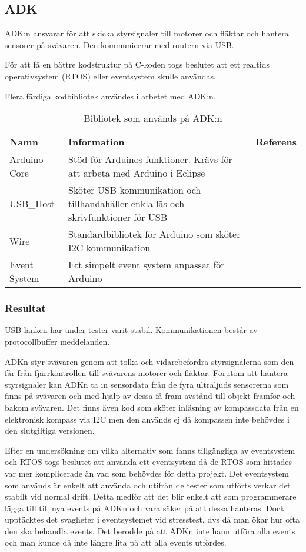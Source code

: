 \subsection{ADK}
ADK:n ansvarar för att skicka styrsignaler till motorer och fläktar och hantera sensorer på svävaren. 
Den kommunicerar med routern via USB.

För att få en bättre kodstruktur på C-koden togs beslutet att ett realtids operativsystem (RTOS) 
eller eventsystem skulle användas.

Flera färdiga kodbibliotek användes i arbetet med ADK:n. 

\begin{table}[htb]
\centering
\caption{Bibliotek som används på ADK:n}
\label{tbl:BOM}
\begin{tabular}{|l|p{}|c|}
\hline
\textbf{Namn} & \textbf{Information} & \textbf{Referens} \\
\hline
Arduino Core & Stöd för Arduinos funktioner. Krävs för att arbeta med Arduino i Eclipse &  \cite{Eclipse_ArduinoCore}\\ 
\hline
USB\_Host & Sköter USB kommunikation och tillhandahåller enkla läs och skrivfunktioner för USB & \cite{USBHost}\\
\hline
Wire & Standardbibliotek för Arduino som sköter I2C kommunikation &  \cite{Wire}\\
\hline
Event System & Ett simpelt event system anpassat för Arduino & \cite{Eventsystem} \\
\hline
\end{tabular}	
\end{table}

\subsubsection{Resultat}
USB länken har under tester varit stabil.
Kommunikationen består av protocollbuffer meddelanden.

ADKn styr svävaren genom att tolka och vidarebefordra styrsignalerna 
som den får från fjärrkontrollen till svävarens motorer och fläktar. 
Förutom att hantera styrsignaler kan ADKn ta in sensordata från de fyra ultraljuds 
sensorerna som finns på svävaren och med hjälp av dessa få fram avstånd till objekt framför och bakom svävaren.
Det finns även kod som sköter inläsning av kompassdata från en elektronisk kompass \cite{kompass} via I2C men den 
används ej då kompassen inte behövdes i den slutgiltiga versionen.

Efter en undersökning om vilka alternativ som fanns tillgängliga av eventsystem och RTOS togs beslutet 
att använda ett eventsystem då de RTOS som hittades var mer komplicerade än vad som behövdes för detta projekt.
Det eventsystem som används är enkelt att använda och utifrån de tester som utförts verkar det stabilt vid normal drift. 
Detta medför att det blir enkelt att som programmerare lägga till till nya events på ADKn och 
vara säker på att dessa hanteras. 
Dock upptäcktes det svagheter i eventsystemet vid stresstest, dvs då man ökar hur ofta den ska behandla events. 
Det berodde på att ADKn inte hann utföra alla events och man kunde då inte längre lita på att alla events utfördes.

